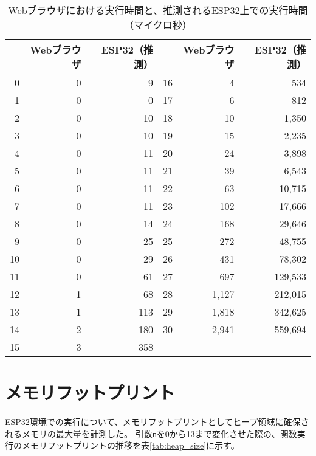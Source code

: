 \begin{table}[htbp]
  \caption{Webブラウザにおける実行時間と、推測されるESP32上での実行時間（マイクロ秒）}
  \label{tab:fib_time_browser}
  \begin{center}
    \begin{tabular}{|r|r|r||r|r|r|}
      \hline
      & Webブラウザ & ESP32（推測） & & Webブラウザ & ESP32（推測） \\ \hline
       0 &     0 &       9 & 16 &     4 &     534 \\ \hline
       1 &     0 &       0 & 17 &     6 &     812 \\ \hline
       2 &     0 &      10 & 18 &    10 &   1,350 \\ \hline
       3 &     0 &      10 & 19 &    15 &   2,235 \\ \hline
       4 &     0 &      11 & 20 &    24 &   3,898 \\ \hline
       5 &     0 &      11 & 21 &    39 &   6,543 \\ \hline
       6 &     0 &      11 & 22 &    63 &  10,715 \\ \hline
       7 &     0 &      11 & 23 &   102 &  17,666 \\ \hline
       8 &     0 &      14 & 24 &   168 &  29,646 \\ \hline
       9 &     0 &      25 & 25 &   272 &  48,755 \\ \hline
      10 &     0 &      29 & 26 &   431 &  78,302 \\ \hline
      11 &     0 &      61 & 27 &   697 & 129,533 \\ \hline
      12 &     1 &      68 & 28 & 1,127 & 212,015 \\ \hline
      13 &     1 &     113 & 29 & 1,818 & 342,625 \\ \hline
      14 &     2 &     180 & 30 & 2,941 & 559,694 \\ \hline
      15 &     3 &     358 &    &       &         \\ \hline
    \end{tabular}
  \end{center}
\end{table}

\section{メモリフットプリント}

ESP32環境での実行について、メモリフットプリントとしてヒープ領域に確保されるメモリの最大量を計測した。
引数\verb|n|を0から13まで変化させた際の、関数実行のメモリフットプリントの推移を表\ref{tab:heap_size}に示す。

